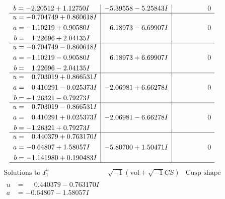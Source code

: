 \documentclass[1p]{elsarticle_modified}
\theoremstyle{definition}
\newcommand{\I}{\sqrt{-1}}
\begin{document}
$$\begin{array}{c|c|c}
\begin{aligned}
b &= -2.20512 + 1.12750 I\end{aligned}
 & -5.39558 - 5.25843 I & \phantom{-0.000000 } 0 \\ \hline\begin{aligned}
u &= -0.704749 + 0.860618 I \\
a &= -1.10219 + 0.90580 I \\
b &= \phantom{-}1.22696 + 2.04135 I\end{aligned}
 & \phantom{-}6.18973 - 6.69907 I & \phantom{-0.000000 } 0 \\ \hline\begin{aligned}
u &= -0.704749 - 0.860618 I \\
a &= -1.10219 - 0.90580 I \\
b &= \phantom{-}1.22696 - 2.04135 I\end{aligned}
 & \phantom{-}6.18973 + 6.69907 I & \phantom{-0.000000 } 0 \\ \hline\begin{aligned}
u &= \phantom{-}0.703019 + 0.866531 I \\
a &= \phantom{-}0.410291 - 0.025373 I \\
b &= -1.26321 - 0.79273 I\end{aligned}
 & -2.06981 + 6.66278 I & \phantom{-0.000000 } 0 \\ \hline\begin{aligned}
u &= \phantom{-}0.703019 - 0.866531 I \\
a &= \phantom{-}0.410291 + 0.025373 I \\
b &= -1.26321 + 0.79273 I\end{aligned}
 & -2.06981 - 6.66278 I & \phantom{-0.000000 } 0 \\ \hline\begin{aligned}
u &= \phantom{-}0.440379 + 0.763170 I \\
a &= -0.64807 + 1.58057 I \\
b &= -1.141980 + 0.190483 I\end{aligned}
 & -5.80700 + 1.50471 I & \phantom{-0.000000 } 0\\
 \hline 
 \end{array}$$\newpage$$\begin{array}{c|c|c}  
\text{Solutions to }I^u_{1}& \I (\text{vol} + \sqrt{-1}CS) & \text{Cusp shape}\\
 \hline 
\begin{aligned}
u &= \phantom{-}0.440379 - 0.763170 I \\
a &= -0.64807 - 1.58057 I \\

\end{aligned}
\end{array}$$
\end{document}
